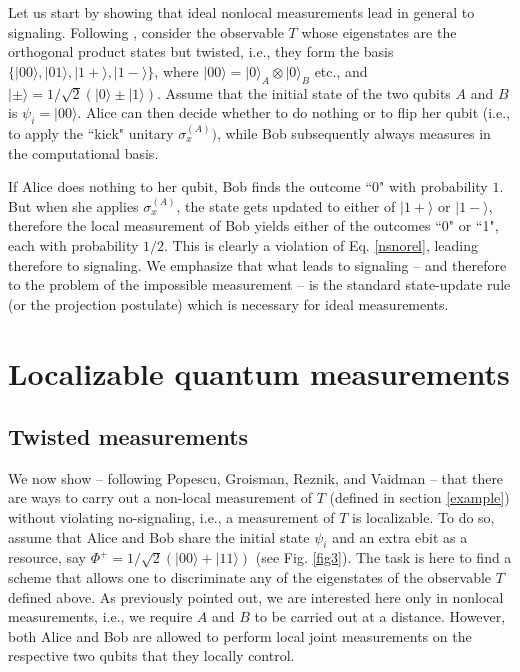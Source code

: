 \documentclass[a4paper,twocolumn,11pt,accepted=2024-02-14]{quantumarticle}
\newcommand{\ket}[1]{| {#1} \rangle} %
\begin{document}
Let us start by showing that ideal nonlocal measurements lead in general to signaling. Following        \cite{groisman2001nonlocal, vaidman2003instantaneous}, consider the observable $T$ whose eigenstates are the orthogonal product states but twisted, i.e., they form the basis $\{\ket{00}, \ket{01}, \ket{1+}, \ket{1-}\}$, where $\ket{00}=\ket{0}_A\otimes \ket{0}_B$ etc., and $\ket{\pm}=1/\sqrt{2}(\ket{0}\pm\ket{1})$. Assume that the initial state of the two qubits $A$ and $B$ is $\psi_i=\ket{00}$. Alice can then decide whether to do nothing or to flip her qubit (i.e., to apply the ``kick" unitary $\sigma_x^{(A)})$, while Bob subsequently always measures in the computational basis.

If Alice does nothing to her qubit, Bob finds the outcome ``0" with probability $1$. But when she applies $\sigma_x^{(A)}$, the state gets updated to either of $\ket{1+}$ or $\ket{1-}$, therefore the local measurement of Bob yields either of the outcomes ``0" or ``1", each with probability  $1/2$. This is clearly a violation of Eq. \eqref{nsnorel}, leading therefore to signaling. We emphasize that what leads to signaling -- and therefore to the problem of the impossible measurement -- is the standard state-update rule (or the projection postulate) which is necessary for ideal measurements. 


 
\section{Localizable quantum measurements}
\label{localiz}

\subsection{Twisted measurements}
\label{twisted}


We now show -- following Popescu, Groisman, Reznik, and Vaidman \cite{popescu1994causality, groisman2002measurements, vaidman2003instantaneous} -- that  there are ways to carry out a non-local measurement of $T$ (defined in section \ref{example}) without violating no-signaling, i.e., a measurement of $T$ is localizable. To do so, assume that Alice and Bob share the initial state $\psi_i$  and an extra ebit as a resource, say $\Phi^+=1/\sqrt{2}(\ket{00}+\ket{11})$ (see Fig. \ref{fig3}). The task is here to find a scheme that allows one to discriminate any of the eigenstates of the observable $T$ defined above. As previously pointed out, we are interested here only in nonlocal measurements, i.e., we require $A$ and $B$ to be carried out at a distance. However, both Alice and Bob are allowed to perform local joint measurements on the respective two qubits that they locally control. 
\end{document}
